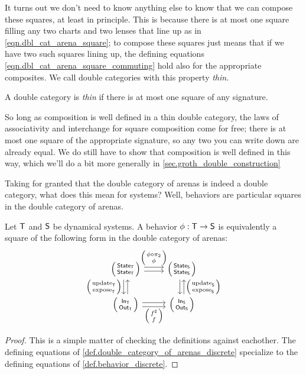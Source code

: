 \documentclass[DynamicalBook]{subfiles}
\begin{document}
It turns out we don't need to know anything else to know that we can compose
these squares, at least in principle. This is because there is at most one
square filling any two charts and two lenses that line up as in
\cref{eqn.dbl_cat_arena_square}; to compose these squares just means that if we
have two such squares lining up, the defining equations
\cref{eqn.dbl_cat_arena_square_commuting} hold also for the appropriate
composites. We call double categories with this property \emph{thin}.

\begin{definition}
  A double category is \emph{thin} if there is at most one square of any
  signature.
\end{definition}

So long as composition is well defined in a thin double category, the laws of
associativity and interchange for square composition come for free; there is at
most one square of the appropriate signature, so any two you can write down are
already equal. We do still have to show that composition is well defined in this
way, which we'll do a bit more generally in \cref{sec.groth_double_construction}

Taking for granted that the double category of arenas is indeed a double
category, what does this mean for systems? Well, behaviors are particular
squares in the double category of arenas.

\begin{proposition}\label{prop.behavior_as_square_of_arenas_discrete}
  Let $\mathsf{T}$ and $\mathsf{S}$ be dynamical systems. A behavior $\phi : \mathsf{T}
  \to \mathsf{S}$ is equivalently a square of the following form in the double
  category of arenas:
  \begin{equation}\label{eqn.behavior_as_square_of_arenas_discrete}
    \begin{tikzcd}
      \lens{\State{T}}{\State{T}} \ar[r, shift left, "\lens{\phi \circ
        \pi_2}{\phi}"] \ar[r, shift right] \ar[d, shift right,
      "\lens{\update{T}}{\expose{T}}"'] \ar[d, shift left, leftarrow] &
      \lens{\State{S}}{\State{S}} \ar[d, shift left, leftarrow,
      "\lens{\update{S}}{\expose{S}}"] \ar[d, shift right]\\
      \lens{\In{T}}{\Out{T}} \ar[r, shift right, "\lens{f^{\sharp}}{f}"'] \ar[r,
      shift left] & \lens{\In{S}}{\Out{S}}
    \end{tikzcd}
  \end{equation}
\end{proposition}
\begin{proof}
  This is a simple matter of checking the definitions against eachother. The
  defining equations of \cref{def.double_category_of_arenas_discrete} specialize
  to the defining equations of \cref{def.behavior_discrete}.
\end{proof}
\end{document}
